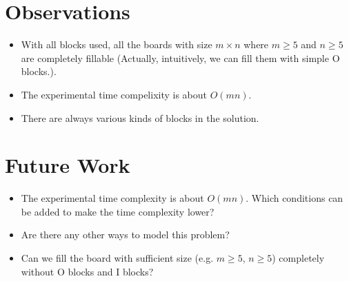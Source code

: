 \documentclass[12pt, a4paper]{article}
\theoremstyle{mystyle}
\begin{document}
    \section{Observations}
        \begin{itemize}
            \item With all blocks used, all the boards with size $m\times n$ where $m\geq 5$ and $n\geq 5$ are completely fillable (Actually, intuitively, we can fill them with simple O blocks.).
            \item The experimental time compelixity is about $O(mn)$.
            \item There are always various kinds of blocks in the solution.
        \end{itemize}    
    \section{Future Work}
        \begin{itemize}
            \item The experimental time complexity is about $O(mn)$. Which conditions can be added to make the time complexity lower?
            \item Are there any other ways to model this problem?
            \item Can we fill the board with sufficient size (e.g. $m\geq 5$, $n\geq 5$) completely without O blocks and I blocks?
        \end{itemize}
\end{document}
